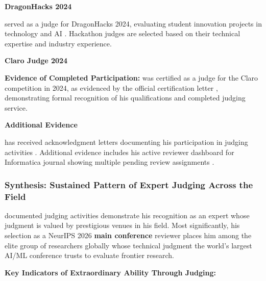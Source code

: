 \textbf{DragonHacks 2024}

\dr served as a judge for DragonHacks 2024, evaluating student innovation projects in technology and AI \cite{JR18}. Hackathon judges are selected based on their technical expertise and industry experience.

\textbf{Claro Judge 2024}

\textbf{Evidence of Completed Participation:} \dr was certified as a judge for the Claro competition in 2024, as evidenced by the official certification letter \cite{JR19}, demonstrating formal recognition of his qualifications and completed judging service.

\textbf{Additional Evidence}

\dr has received acknowledgment letters documenting his participation in judging activities \cite{JR20}. Additional evidence includes his active reviewer dashboard for Informatica journal showing multiple pending review assignments \cite{JR21}.


\subsubsection{Synthesis: Sustained Pattern of Expert Judging Across the Field}
\label{judge:synthesis}

\drs documented judging activities demonstrate his recognition as an expert whose judgment is valued by prestigious venues in his field. Most significantly, his selection as a NeurIPS 2026 \textbf{main conference} reviewer places him among the elite group of researchers globally whose technical judgment the world's largest AI/ML conference trusts to evaluate frontier research.

\textbf{Key Indicators of Extraordinary Ability Through Judging:}

